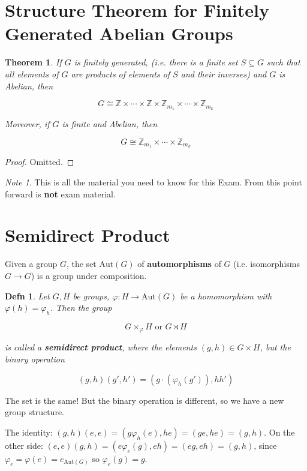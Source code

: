 \documentclass[12pt]{article}
\def\Aut{\text{Aut}}
\def\Z{{\mathbb Z}}
\newtheorem{theorem}{Theorem}
\newtheorem{definition}{Defn}
\theoremstyle{remark}
\theoremstyle{remark}
\theoremstyle{remark}
\theoremstyle{remark}
\theoremstyle{remark}
\newtheorem*{note}{Note}
\begin{document}
\section{Structure Theorem for Finitely Generated Abelian Groups}

\begin{theorem}
  If $G$ is finitely generated, (i.e. there is a finite set $S \subseteq G$ such
  that all elements of $G$ are products of elements of $S$ and their inverses) and
  $G$ is Abelian, then

  \[
    G \cong \Z \times \cdots \times \Z \times \Z_{m_1} \times \cdots \times \Z_{m_k}
  \]

  Moreover, if $G$ is finite and Abelian, then

  \[
    G \cong \Z_{m_1} \times \cdots \times \Z_{m_k}
  \]
\end{theorem}

\begin{proof}
  Omitted.
\end{proof}

\begin{note}
  This is all the material you need to know for this Exam. From this point
  forward is {\bf not} exam material.
\end{note}

\section{Semidirect Product}

Given a group $G$, the set $\Aut(G)$ of {\bf automorphisms} of $G$ (i.e.
isomorphisms $G \to G$) is a group under composition.

\begin{definition}
  Let $G, H$ be groups, $\varphi: H \to \Aut(G)$ be a homomorphism with
  $\varphi(h) = \varphi_h$. Then the group

  \[
    G \times_\varphi H \text{ or } G \rtimes H
  \]

  is called a {\bf semidirect product}, where the elements $(g, h) \in G \times
  H$, but the binary operation

  \[
    (g, h)(g', h') = (g \cdot (\varphi_h(g')), hh')
  \]
\end{definition}

The set is the same! But the binary operation is different, so we have a new
group structure.

The identity: $(g, h)(e, e) = (g \varphi_h(e), he) = (ge, he) = (g, h)$.
On the other side: $(e, e)(g, h) = (e \varphi_e(g), eh) = (eg, eh) = (g, h)$,
since $\varphi_e = \varphi(e) = e_{\Aut(G)}$ so $\varphi_e(g) = g$.
\end{document}
